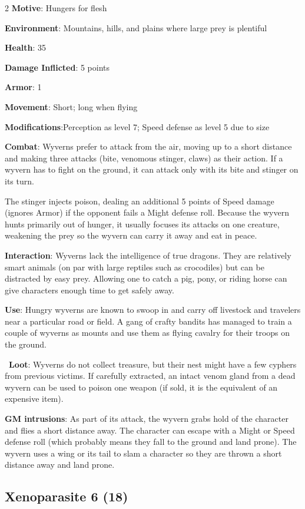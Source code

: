 \begin{multicols}{2}
\textbf{Motive}: Hungers for flesh 

\textbf{Environment}: Mountains, hills, and plains where large prey is plentiful 

\textbf{Health}: 35 

\textbf{Damage Inflicted}: 5 points 

\textbf{Armor}: 1 

\textbf{Movement}: Short; long when flying 

\textbf{Modifications}:Perception as level 7; Speed defense as level 5 due to size 

\textbf{Combat}: Wyverns prefer to attack from the air, moving up to a short distance and making three attacks (bite, venomous stinger, claws) as their action. If a wyvern has to fight on the ground, it can attack only with its bite and stinger on its turn. 

The stinger injects poison, dealing an additional 5 points of Speed damage (ignores Armor) if the opponent fails a Might defense roll. Because the wyvern hunts primarily out of hunger, it usually focuses its attacks on one creature, weakening the prey so the wyvern can carry it away and eat in peace. 

\textbf{Interaction}: Wyverns lack the intelligence of true dragons. They are relatively smart animals (on par with large reptiles such as crocodiles) but can be distracted by easy prey. Allowing one to catch a pig, pony, or riding horse can give characters enough time to get safely away. 

\textbf{Use}: Hungry wyverns are known to swoop in and carry off livestock and travelers near a particular road or field. A gang of crafty bandits has managed to train a couple of wyverns as mounts and use them as flying cavalry for their troops on the ground.

 \textbf{Loot}: Wyverns do not collect treasure, but their nest might have a few cyphers from previous victims. If carefully extracted, an intact venom gland from a dead wyvern can be used to poison one weapon (if sold, it is the equivalent of an expensive item).

\textbf{GM intrusions}: As part of its attack, the wyvern grabs hold of the character and flies a short distance away. The character can escape with a Might or Speed defense roll (which probably means they fall to the ground and land prone). The wyvern uses a wing or its tail to slam a character so they are thrown a short distance away and land prone.

\subsection{Xenoparasite	6 (18)}


\end{multicols}
